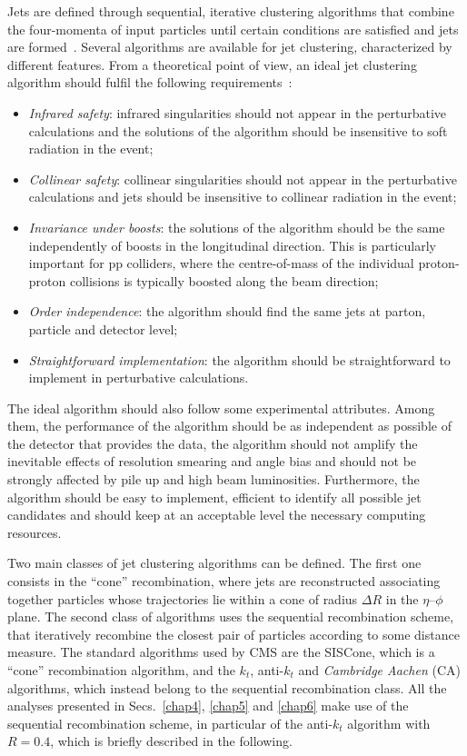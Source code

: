 Jets are defined through sequential, iterative clustering algorithms that combine the four-momenta of input particles until certain conditions are satisfied and jets are formed~\cite{Salam:2009jx}. Several algorithms are available for jet clustering, characterized by different features. From a theoretical point of view, an ideal jet clustering algorithm should fulfil the following requirements~\cite{Blazey:2000qt}:
\begin{itemize}
\item \emph{Infrared safety}: infrared singularities should not appear in the perturbative calculations and the solutions of the algorithm should be insensitive to soft radiation in the event;
\item \emph{Collinear safety}: collinear singularities should not appear in the perturbative calculations and jets should be insensitive to collinear radiation in the event;
\item \emph{Invariance under boosts}: the solutions of the algorithm should be the same independently of boosts in the longitudinal direction. This is particularly important for pp colliders, where the centre-of-mass of the individual proton-proton collisions is typically boosted along the beam direction;
\item \emph{Order independence}: the algorithm should find the same jets at parton, particle and detector level;
\item \emph{Straightforward implementation}: the algorithm should be straightforward to implement in perturbative calculations.
\end{itemize}
The ideal algorithm should also follow some experimental attributes. Among them, the performance of the algorithm should be as independent as possible of the detector that provides the data, the algorithm should not amplify the inevitable effects of resolution smearing and angle bias and should not be strongly affected by pile up and high beam luminosities. Furthermore, the algorithm should be easy to implement, efficient to identify all possible jet candidates and should keep at an acceptable level the necessary computing resources.

Two main classes of jet clustering algorithms can be defined. The first one consists in the ``cone'' recombination, where jets are reconstructed associating together particles whose trajectories lie within a cone of radius $\Delta R$ in the $\eta$--$\phi$ plane. The second class of algorithms uses the sequential recombination scheme, that iteratively recombine the closest pair of particles according to some distance measure. The standard algorithms used by CMS are the SISCone, which is a ``cone'' recombination algorithm, and the $k_t$, anti-$k_t$ and \emph{Cambridge Aachen} (CA) algorithms, which instead belong to the sequential recombination class.
All the analyses presented in Secs.~\ref{chap4}, \ref{chap5} and \ref{chap6} make use of the sequential recombination scheme, in particular of the anti-$k_t$ algorithm with $R=0.4$, which is briefly described in the following.

